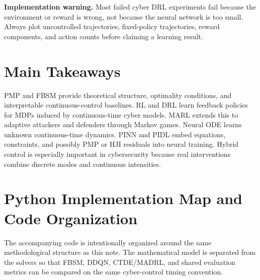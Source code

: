 \documentclass[11pt,a4paper]{article}
\begin{document}
\begin{boxednote}
\textbf{Implementation warning.}
Most failed cyber DRL experiments fail because the environment or reward is wrong, not because the neural network is too small. Always plot uncontrolled trajectories, fixed-policy trajectories, reward components, and action counts before claiming a learning result.
\end{boxednote}

\section{Main Takeaways}
PMP and FBSM provide theoretical structure, optimality conditions, and interpretable continuous-control baselines. RL and DRL learn feedback policies for MDPs induced by continuous-time cyber models. MARL extends this to adaptive attackers and defenders through Markov games. Neural ODE learns unknown continuous-time dynamics. PINN and PIDL embed equations, constraints, and possibly PMP or HJI residuals into neural training. Hybrid control is especially important in cybersecurity because real interventions combine discrete modes and continuous intensities.



\section{Python Implementation Map and Code Organization}
The accompanying code is intentionally organized around the same methodological structure as this note.  The mathematical model is separated from the solvers so that FBSM, DDQN, CTDE/MADRL, and shared evaluation metrics can be compared on the same cyber-control timing convention.
\end{document}

